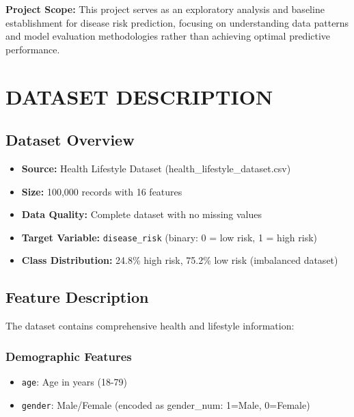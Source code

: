\documentclass[12pt,a4paper]{article}
\begin{document}
\begin{infobox}
\textbf{Project Scope:} This project serves as an exploratory analysis and baseline establishment for disease risk prediction, focusing on understanding data patterns and model evaluation methodologies rather than achieving optimal predictive performance.
\end{infobox}

\section{DATASET DESCRIPTION}

\subsection{Dataset Overview}
\begin{infobox}
\begin{itemize}[leftmargin=1em]
    \item \textbf{Source:} Health Lifestyle Dataset (health\_lifestyle\_dataset.csv)
    \item \textbf{Size:} 100,000 records with 16 features
    \item \textbf{Data Quality:} Complete dataset with no missing values
    \item \textbf{Target Variable:} \texttt{disease\_risk} (binary: 0 = low risk, 1 = high risk)
    \item \textbf{Class Distribution:} 24.8\% high risk, 75.2\% low risk (imbalanced dataset)
\end{itemize}
\end{infobox}

\subsection{Feature Description}
The dataset contains comprehensive health and lifestyle information:

\subsubsection{Demographic Features}
\begin{itemize}
    \item \texttt{age}: Age in years (18-79)
    \item \texttt{gender}: Male/Female (encoded as gender\_num: 1=Male, 0=Female)
\end{itemize}
\end{document}
